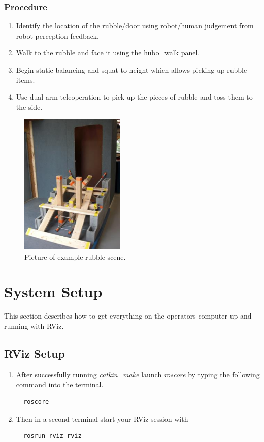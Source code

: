 \documentclass[letterpaper, 10 pt]{report}
\begin{document}
\subsection{Procedure}
\begin{enumerate}
\item Identify the location of the rubble/door using robot/human judgement from robot perception feedback.
\item Walk to the rubble and face it using the hubo\_walk panel.
\item Begin static balancing and squat to height which allows picking up rubble items.
\item Use dual-arm teleoperation to pick up the pieces of rubble and toss them to the side.
\end{enumerate}
\begin{figure}[ht]
  \centering
  \includegraphics[width=5.0cm]{figures/rubble-clearing}
  \caption{Picture of example rubble scene.}
  \label{fig:Rubble-image}
\end{figure}

\newpage

%

\chapter{System Setup}\label{chap:system-setup}
This section describes how to get everything on the operators computer up and running with RViz.
\section{RViz Setup}
\begin{enumerate}
  \item After successfully running \textit{catkin\_make} launch \textit{roscore} by typing the following command into the terminal.
  \begin{lstlisting}
  roscore
  \end{lstlisting}
  \item Then in a second terminal start your RViz session with
  \begin{lstlisting}
  rosrun rviz rviz
  \end{lstlisting}
\end{enumerate}
\end{document}
